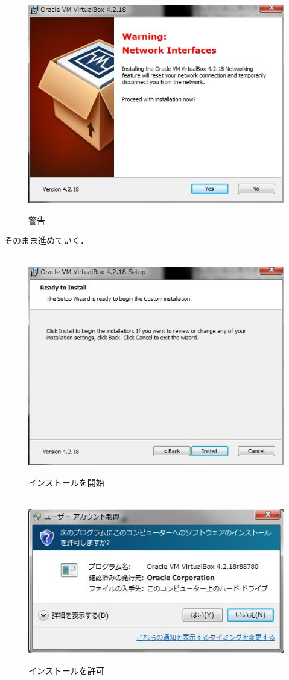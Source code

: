 \begin{figure}[htbp]
\centering　
\includegraphics[width=13cm]{VB5.png}
\caption{警告}
\end{figure}

そのまま進めていく．

\begin{figure}[htbp]
\centering　
\includegraphics[width=13cm]{VB6.png}
\caption{インストールを開始}
\end{figure}

\begin{figure}[htbp]
\centering　
\includegraphics[width=13cm]{VB7.png}
\caption{インストールを許可}
\end{figure}


